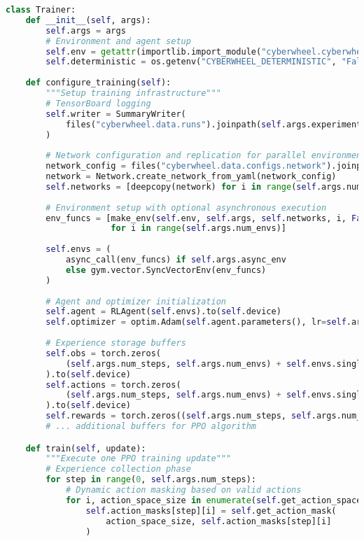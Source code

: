 \documentclass[12pt,a4paper]{article}
\begin{document}
\begin{lstlisting}[language=Python, caption=PPO Trainer Core Logic]
class Trainer:
    def __init__(self, args):
        self.args = args
        # Environment and agent setup
        self.env = getattr(importlib.import_module("cyberwheel.cyberwheel_envs"), args.environment)
        self.deterministic = os.getenv("CYBERWHEEL_DETERMINISTIC", "False").lower() in ('true', '1', 't')
        
    def configure_training(self):
        """Setup training infrastructure"""
        # TensorBoard logging
        self.writer = SummaryWriter(
            files("cyberwheel.data.runs").joinpath(self.args.experiment_name)
        )
        
        # Network configuration and replication for parallel environments
        network_config = files("cyberwheel.data.configs.network").joinpath(self.args.network_config)
        network = Network.create_network_from_yaml(network_config)
        self.networks = [deepcopy(network) for i in range(self.args.num_envs)]
        
        # Environment setup with optional asynchronous execution
        env_funcs = [make_env(self.env, self.args, self.networks, i, False) 
                     for i in range(self.args.num_envs)]
        
        self.envs = (
            async_call(env_funcs) if self.args.async_env 
            else gym.vector.SyncVectorEnv(env_funcs)
        )
        
        # Agent and optimizer initialization
        self.agent = RLAgent(self.envs).to(self.device)
        self.optimizer = optim.Adam(self.agent.parameters(), lr=self.args.learning_rate, eps=1e-5)
        
        # Experience storage buffers
        self.obs = torch.zeros(
            (self.args.num_steps, self.args.num_envs) + self.envs.single_observation_space.shape
        ).to(self.device)
        self.actions = torch.zeros(
            (self.args.num_steps, self.args.num_envs) + self.envs.single_action_space.shape
        ).to(self.device)
        self.rewards = torch.zeros((self.args.num_steps, self.args.num_envs)).to(self.device)
        # ... additional buffers for PPO algorithm

    def train(self, update):
        """Execute one PPO training update"""
        # Experience collection phase
        for step in range(0, self.args.num_steps):
            # Dynamic action masking based on valid actions
            for i, action_space_size in enumerate(self.get_action_space_sizes()):
                self.action_masks[step][i] = self.get_action_mask(
                    action_space_size, self.action_masks[step][i]
                )
            

\end{lstlisting}
\end{document}
